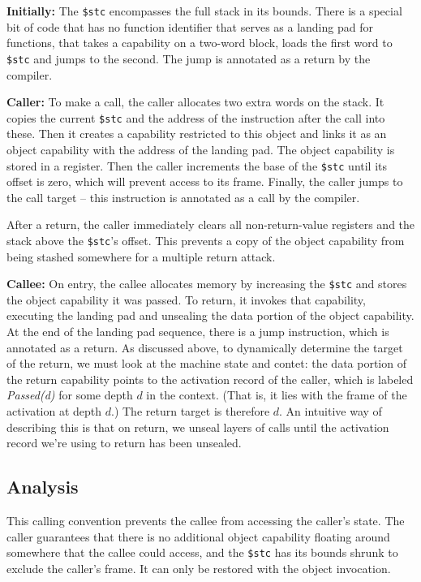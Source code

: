 \documentclass{article}
\begin{document}
{\bf Initially:} The {\tt \$stc} encompasses the full stack in its bounds. There is a
special bit of code that has no function identifier that serves as a landing pad for
functions, that takes a capability on a two-word block, loads the first word to {\tt \$stc}
and jumps to the second. The jump is annotated as a return by the compiler.

{\bf Caller:} To make a call, the caller allocates two extra words on the stack. It copies
the current {\tt \$stc} and the address of the instruction after the call into these. Then
it creates a capability restricted to this object and links it as an object capability with
the address of the landing pad. The object capability is stored in a register. Then the
caller increments the base of the {\tt \$stc} until its offset is zero, which will prevent
access to its frame. Finally, the caller jumps to the call target -- this instruction is
annotated as a call by the compiler.

After a return, the caller immediately clears all non-return-value registers and the stack
above the {\tt \$stc}'s offset. This prevents a copy of the object capability from being
stashed somewhere for a multiple return attack.

{\bf Callee:} On entry, the callee allocates memory by increasing the {\tt \$stc} and stores
the object capability it was passed. To return, it invokes that capability, executing the
landing pad and unsealing the data portion of the object capability. At the end of the
landing pad sequence, there is a jump instruction, which is annotated as a return. As
discussed above, to dynamically determine the target of the return, we must look at the
machine state and contet: the data portion of the return capability points to the activation
record of the caller, which is labeled {\it Passed(d)} for some depth \(d\) in the context.
(That is, it lies with the frame of the activation at depth \(d\).) The return target is
therefore \(d\). An intuitive way of describing this is that on return, we unseal layers of
calls until the activation record we're using to return has been unsealed.

\subsection{Analysis}

This calling convention prevents the callee from accessing the caller's state. The caller
guarantees that there is no additional object capability floating around somewhere that
the callee could access, and the {\tt \$stc} has its bounds shrunk to exclude the caller's
frame. It can only be restored with the object invocation.
\end{document}
